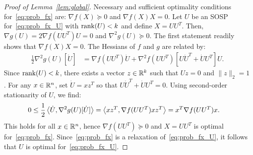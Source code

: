 \begin{proof}[Proof of Lemma~\ref{lem:global}]
	Necessary and sufficient optimality conditions for~\eqref{eq:prob_fx} are: $\nabla f(X) \succeq 0$ and $\nabla f(X)X = 0$. Let $U$ be an SOSP for~\eqref{eq:prob_fx_U} with $\operatorname{rank}(U) < k$  and define $X = UU^T$. Then, $\nabla g(U) = 2\nabla f(UU^T)U = 0$ and $\nabla^2 g(U) \succeq 0$. The first statement readily shows that $\nabla f(X)X = 0$. The Hessians of $f$ and $g$ are related by:%
	\begin{align*}
		\frac{1}{2}\nabla^2 g(U)[\dot U] & = \nabla f(UU^T)\dot U + \nabla^2 f(UU^T)[U\dot U^T + \dot U U^T]U.
	\end{align*}
	Since $\operatorname{rank}(U) < k$, there exists a vector $z \in \mathbb{R}^{k}$ such that $Uz = 0$ and $\|z\|_2 = 1$. For any $x \in \mathbb{R}^{n}$, set $\dot U = xz^T$ so that $U\dot U^T + \dot U U^T = 0$. Using second-order stationarity of $U$, we find:
	\begin{align*}
		0 \leq \frac{1}{2}\left\langle \dot U, \nabla^2 g(U)[\dot U] \right\rangle & = \left\langle xz^T, \nabla f(UU^T)xz^T \right\rangle = x^T \nabla f(UU^T) x.
	\end{align*}
	This holds for all $x \in \mathbb{R}^{n}$, hence $\nabla f(UU^T) \succeq 0$ and $X = UU^T$ is optimal for~\eqref{eq:prob_fx}. Since~\eqref{eq:prob_fx} is a relaxation of~\eqref{eq:prob_fx_U}, it follows that $U$ is optimal for~\eqref{eq:prob_fx_U}.
\end{proof}



